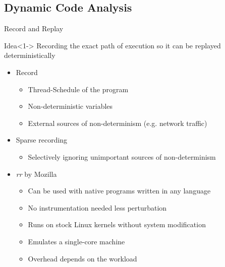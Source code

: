 \documentclass[english,aspectratio=43,t]{beamer}
\begin{document}
\subsection{Dynamic Code Analysis}
\frame\sectionpage

\begin{frame}{Record and Replay}
    \begin{block}{Idea}<1->
        Recording the exact path of execution so it can be replayed deterministically
    \end{block}
    \begin{itemize}
        \item<2-> Record
        \begin{itemize}
            \item Thread-Schedule of the program
            \item Non-deterministic variables
            \item External sources of non-determinism (e.g. network traffic)
        \end{itemize}
        \item<3-> Sparse recording~\cite{lidbury2019sparse}
        \begin{itemize}
            \item Selectively ignoring unimportant sources of non-determinism
        \end{itemize}
        \item<4-> \emph{rr} by Mozilla~\cite{mozillarr}
        \begin{itemize}
            \item Can be used with native programs written in any language
            \item No instrumentation needed \Rightarrow{} less perturbation
            \item Runs on stock Linux kernels without system modification
            \item Emulates a single-core machine
            \item Overhead depends on the workload
        \end{itemize}
    \end{itemize}
\end{frame}
\end{document}
